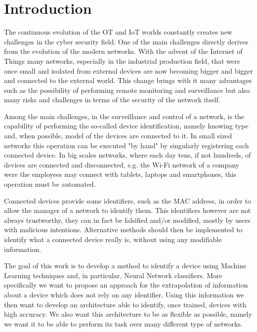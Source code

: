 \chapter{Introduction}

The continuous evolution of the OT and IoT worlds constantly creates new challenges in the cyber security field. One of the main challenges directly derives from the evolution of the modern networks. With the advent of the Internet of Things\cite{iot_exp} many networks, especially in the industrial production field, that were once small and isolated from external devices are now becoming bigger and bigger and connected to the external world. This change brings with it many advantages such as the possibility of performing remote monitoring and surveillance but also many risks and challenges in terms of the security of the network itself\cite{iot_sec}.

Among the main challenges, in the surveillance and control of a network, is the capability of performing the so-called device identification, namely knowing type and, when possible, model of the devices are connected to it. In small sized networks this operation can be executed "by hand" by singularly registering each connected device. In big scales networks, where each day tens, if not hundreds, of devices are connected and disconnected, e.g. the Wi-Fi network of a company were the employees may connect with tablets, laptops and smartphones, this operation must be automated. 

Connected devices provide some identifiers, such as the MAC address, in order to allow the manager of a network to identify them. This identifiers however are not always trustworthy, they can in fact be falsified and/or modified\cite{mac_atk}, mostly by users with malicious intentions. Alternative methods should then be implemented to identify what a connected device really is, without using any modifiable information.

The goal of this work is to develop a method to identify a device using Machine Learning techniques and, in particular, Neural Network classifiers. More specifically we want to propose an approach for the extrapolation of information about a device which does not rely on any identifier. Using this information we then want to develop an architecture able to identify, once trained, devices with high accuracy. We also want this architecture to be as flexible as possible, namely we want it to be able to perform its task over many different type of networks. 